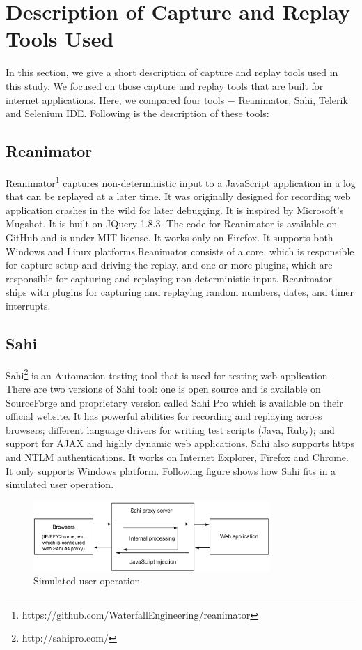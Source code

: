 \documentclass[12pt,journal]{IEEEtran}
\begin{document}
\section{Description of Capture and Replay Tools Used}
In this section, we give a short description of capture and replay tools used in this study. We focused on those capture and replay tools that are built for internet applications. Here, we compared four tools $-$ Reanimator, Sahi, Telerik and Selenium IDE. Following is the description of these tools:
\subsection{Reanimator}
Reanimator\footnote{https://github.com/WaterfallEngineering/reanimator} captures non-deterministic input to a JavaScript application in a log that can be replayed at a later time. It was originally designed for recording web application crashes in the wild for later debugging. It is inspired by Microsoft’s Mugshot. It is built on JQuery 1.8.3. The code for Reanimator is available on GitHub and is under MIT license. It works only on Firefox. It supports both Windows and Linux platforms.Reanimator consists of a core, which is responsible for capture setup and driving the replay, and one or more plugins, which are responsible for capturing and replaying non-deterministic input. Reanimator ships with plugins for capturing and replaying random numbers, dates, and timer interrupts. 

\subsection{Sahi}
Sahi\footnote{http://sahipro.com/} is an Automation testing tool that is used for testing web application. There are two versions of Sahi tool: one is open source and is available on SourceForge and proprietary version called Sahi Pro which is available on their official website. It has powerful abilities for recording and replaying across browsers; different language drivers for writing test scripts (Java, Ruby); and support for AJAX and highly dynamic web applications. Sahi also supports https and NTLM authentications. It works on Internet Explorer, Firefox and Chrome. It only supports Windows platform. Following figure shows how Sahi fits in a simulated user operation.
\begin{figure}[h!]
 \hfill\includegraphics[width=9cm]{figures/sahi.PNG}\hspace*{\fill}
 \caption{Simulated user operation}
 \label{fig}
\end{figure}
\end{document}
